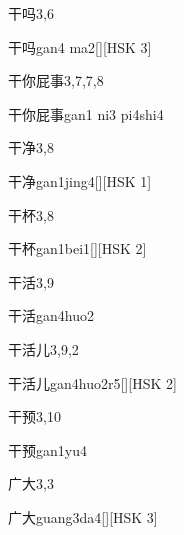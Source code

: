 \begin{entry}{干吗}{3,6}
  \begin{phonetics}{干吗}{gan4 ma2}[][HSK 3]
  \end{phonetics}
\end{entry}

\begin{entry}{干你屁事}{3,7,7,8}
  \begin{phonetics}{干你屁事}{gan1 ni3 pi4shi4}
  \end{phonetics}
\end{entry}

\begin{entry}{干净}{3,8}
  \begin{phonetics}{干净}{gan1jing4}[][HSK 1]
  \end{phonetics}
\end{entry}

\begin{entry}{干杯}{3,8}
  \begin{phonetics}{干杯}{gan1bei1}[][HSK 2]
  \end{phonetics}
\end{entry}

\begin{entry}{干活}{3,9}
  \begin{phonetics}{干活}{gan4huo2}
  \end{phonetics}
\end{entry}

\begin{entry}{干活儿}{3,9,2}
  \begin{phonetics}{干活儿}{gan4huo2r5}[][HSK 2]
  \end{phonetics}
\end{entry}

\begin{entry}{干预}{3,10}
  \begin{phonetics}{干预}{gan1yu4}
  \end{phonetics}
\end{entry}

\begin{entry}{广大}{3,3}
  \begin{phonetics}{广大}{guang3da4}[][HSK 3]
  \end{phonetics}
\end{entry}

